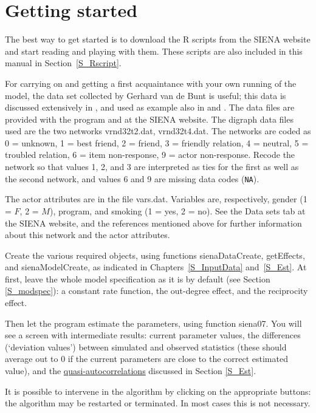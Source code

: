 \documentclass[a4paper,fleqn,11pt]{article}
\newcommand{\+}{\, + \,}
\newcommand{\sfn}[1]{\textsf{#1}}
\newcommand{\R}{{\sf R }}
\newcommand{\SI}{{\sf SIENA }}
\begin{document}
\newpage
\section{Getting started}
\label{S_getting}

The best way to get started is to download the \R scripts from the
\SI website and start reading and playing with them.
These scripts are also included in this manual in Section~\ref{S_Rscript}.

For carrying on and getting a first acquaintance with your own running
of the model, the data set collected by Gerhard van de Bunt
is useful; this data is discussed extensively in
\citet*{vanBunt99, vanBuntEA99},
and used as example also in \citet{Snijders01} and \citet{Snijders05}.
The data files are provided with the program
and at the \SI website. The digraph data files
used are the two networks {\sf vrnd32t2.dat}, {\sf vrnd32t4.dat}.
The networks are coded as 0 = unknown, 1 = best friend, 2 = friend,
3 = friendly relation, 4 = neutral, 5 = troubled relation, 6 = item
non-response, 9 = actor non-response.
Recode the network so that values 1, 2, and 3 are interpreted
as ties for the first as well as the second network, and values 6 and 9
are missing data codes (\texttt{NA}).

The actor attributes are in the file {\sf vars.dat}. Variables
are, respectively, gender (1 = $F$, 2 = $M$), program, and smoking
(1 = yes, 2 = no). See the \sfn{Data sets} tab at the
\SI website, and the references mentioned above for further
information about this network and the actor attributes.

Create the various required objects, using functions
\sfn{sienaDataCreate}, \sfn{getEffects}, and \sfn{sienaModelCreate},
as indicated in Chapters~\ref{S_InputData} and~\ref{S_Est}.
At first, leave the whole model specification as
it is by default (see Section \ref{S_modspec}):
a constant rate function, the out-degree effect, and
the reciprocity effect.

Then let the program estimate the parameters, using function \sfn{siena07}.
You will see a
screen with intermediate results: current parameter values, the
differences (`deviation values') between simulated and observed
statistics (these should average out to 0 if the current
parameters are close to the correct estimated value), and the
\hyperlink{T_quasiac}{quasi-autocorrelations} discussed in Section
\ref{S_Est}.

It is possible to intervene in the algorithm by clicking on the
appropriate buttons:
the algorithm may be restarted or terminated. In most cases
this is not necessary.
\end{document}
